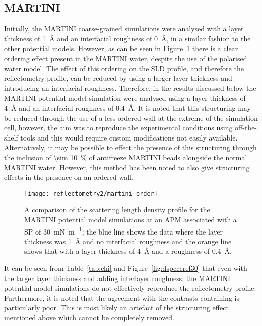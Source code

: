 \subsection{MARTINI}
\label{sec:martanal}
Initially, the MARTINI coarse-grained simulations were analysed with a layer thickness of \SI{1}{\angstrom} and an interfacial roughness of \SI{0}{\angstrom}, in a similar fashion to the other potential models.
However, as can be seen in Figure~\ref{fig:martorder} there is a clear ordering effect present in the MARTINI water, despite the use of the polarised water model.
The effect of this ordering on the SLD profile, and therefore the reflectometry profile, can be reduced by using a larger layer thickness and introducing an interfacial roughness.
Therefore, in the results discussed below the MARTINI potential model simulation were analysed using a layer thickness of \SI{4}{\angstrom} and an interfacial roughness of \SI{0.4}{\angstrom}.
It is noted that this structuring may be reduced through the use of a less ordered wall at the extreme of the simulation cell, however, the aim was to reproduce the experimental conditions using off-the-shelf tools and this would require custom modifications not easily available.
Alternatively, it may be possible to effect the presence of this structuring through the inclusion of \SI{\sim 10}{\percent} of antifreeze MARTINI beads alongside the normal MARTINI water.
However, this method has been noted to also give structuring effects in the presence on an ordered wall.
%
\begin{figure}[t]
    \centering
    \texttt{[image: reflectometry2/martini\_order]}
    \caption{A comparison of the scattering length density profile for the MARTINI potential model simulations at an APM associated with a SP of \SI{30}{\milli\newton\per\meter}; the blue line shows the data where the layer thickness was \SI{1}{\angstrom} and no interfacial roughness and the orange line shows that with a layer thickness of \SI{4}{\angstrom} and a roughness of \SI{0.4}{\angstrom}.}
    \label{fig:martorder}
\end{figure}
%

It can be seen from Table~\ref{tab:chi} and Figure~\ref{fig:dspcccref30} that even with the larger layer thickness and adding interlayer roughness, the MARTINI potential model simulations do not effectively reproduce the reflectometry profile.
Furthermore, it is noted that the agreement with the contrasts containing  is particularly poor.
This is most likely an artefact of the structuring effect mentioned above which cannot be completely removed.

